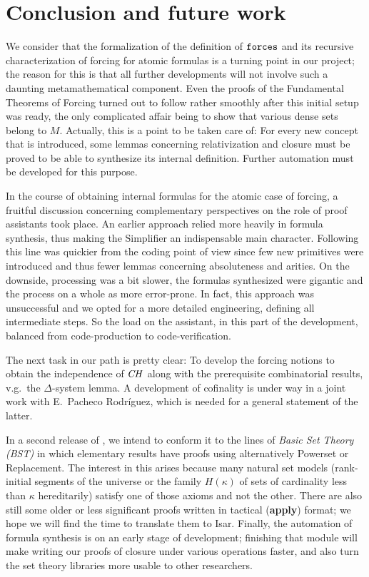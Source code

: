 \section{Conclusion and future work}
\label{sec:conclusion}

We consider that the formalization of the definition of $\mathop{\mathtt{forces}}$
and its recursive characterization of forcing for atomic formulas is
a turning point
in our project; the reason for this is that all further
developments will not involve such a daunting metamathematical
component. Even the proofs of the Fundamental Theorems of Forcing
turned out to follow rather smoothly after this initial setup was
ready, the only complicated affair being to show that various dense sets belong
to $M$. 
%
Actually, this is a point to be taken care of: For every new
concept that is introduced, some lemmas concerning 
relativization and closure must be proved to be able to synthesize its
internal definition. Further automation must be developed for this
purpose.

In the course of obtaining internal formulas for the atomic case of
forcing, a fruitful discussion
concerning complementary perspectives on the role of proof assistants
took place. An earlier approach relied more heavily in formula
synthesis, thus making the Simplifier an indispensable main
character. Following this line was quickier from the coding point of
view since few new primitives were introduced and thus fewer lemmas
concerning absoluteness and arities. On the downside, processing was a
bit slower, the formulas synthesized were gigantic and the process on
a whole as more error-prone. In fact, this approach was unsuccessful
and we opted for a more detailed engineering, defining all
intermediate steps. So the load on the assistant, in this part of the
development, balanced from code-production to code-verification. 

The next task in our path is pretty clear: To develop the forcing
notions to obtain the independence of $\mathit{CH}$ 
along with the prerequisite combinatorial results, v.g.\ the
$\Delta$-system lemma. A development of cofinality is under way in a
joint work with E.~Pacheco Rodríguez, which is needed for a general
statement of the latter. 

In a second release of , we intend to conform
it to the lines of \emph{Basic Set Theory (BST)}
\cite[I.3.1]{kunen2011set} in which elementary results have proofs
using alternatively Powerset or Replacement. The interest in this
arises because many natural set models (rank-initial segments of the
universe or the family $H(\kappa)$ of sets  of cardinality
less than $\kappa$ hereditarily) satisfy one of those axioms and not the
other. There are also still some older or less significant proofs
written in tactical (\textbf{apply}) format; we hope we will find the
time to translate them to Isar. Finally, the automation of formula
synthesis is on an early stage of development; finishing that module
will make writing our proofs of closure under various operations
faster, and also turn the set theory libraries  more
usable to other researchers.

